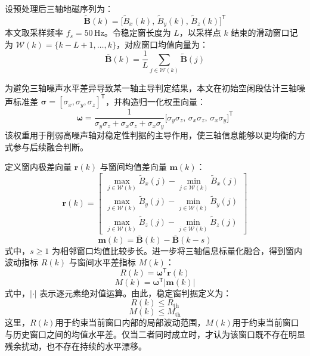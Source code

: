 \documentclass{xdupgthesis}
\begin{document}
设预处理后三轴地磁序列为：
\begin{equation}
    \widetilde{\mathbf{B}}(k)=\big[\widetilde{B}_x(k),\,\widetilde{B}_y(k),\,\widetilde{B}_z(k)\big]^{\mathsf{T}}
\end{equation}
本文取采样频率 $f_s=50\,\mathrm{Hz}$。令稳定窗长度为 $L$，以采样点 $k$ 结束的滑动窗口记为 $\mathcal{W}(k)=\{k-L+1,\ldots,k\}$，对应窗口均值向量为：
\begin{equation}
    \overline{\mathbf{B}}(k)=\frac{1}{L}\sum_{j\in\mathcal{W}(k)}\widetilde{\mathbf{B}}(j)
\end{equation}

为避免三轴噪声水平差异导致某一轴主导判定结果，本文在初始空闲段估计三轴噪声标准差 $\boldsymbol{\sigma}=[\sigma_x,\sigma_y,\sigma_z]^{\mathsf{T}}$，并构造归一化权重向量：
\begin{equation}
    \boldsymbol{\omega}=\frac{1}{\sigma_y\sigma_z+\sigma_x\sigma_z+\sigma_x\sigma_y}
    \big[\sigma_y\sigma_z,\,\sigma_x\sigma_z,\,\sigma_x\sigma_y\big]^{\mathsf{T}}
\end{equation}
该权重用于削弱高噪声轴对稳定性判据的主导作用，使三轴信息能够以更均衡的方式参与后续融合判断。

定义窗内极差向量 $\mathbf{r}(k)$ 与窗间均值差向量 $\mathbf{m}(k)$：
\begin{equation}
    \mathbf{r}(k)=\begin{bmatrix}
        \max\limits_{j\in\mathcal{W}(k)}\widetilde{B}_x(j)-\min\limits_{j\in\mathcal{W}(k)}\widetilde{B}_x(j)\\
        \max\limits_{j\in\mathcal{W}(k)}\widetilde{B}_y(j)-\min\limits_{j\in\mathcal{W}(k)}\widetilde{B}_y(j)\\
        \max\limits_{j\in\mathcal{W}(k)}\widetilde{B}_z(j)-\min\limits_{j\in\mathcal{W}(k)}\widetilde{B}_z(j)
    \end{bmatrix}
\end{equation}
\begin{equation}
    \mathbf{m}(k)=\overline{\mathbf{B}}(k)-\overline{\mathbf{B}}(k-s)
\end{equation}
式中，$s\ge 1$ 为相邻窗口均值比较步长。进一步将三轴信息标量化融合，得到窗内波动指标 $R(k)$ 与窗间水平差指标 $M(k)$：
\begin{equation}
    R(k)=\boldsymbol{\omega}^{\mathsf{T}}\mathbf{r}(k)
\end{equation}
\begin{equation}
    M(k)=\boldsymbol{\omega}^{\mathsf{T}}\left|\mathbf{m}(k)\right|
\end{equation}
式中，$|\cdot|$ 表示逐元素绝对值运算。由此，稳定窗判据定义为：
\begin{equation}
    R(k)\le R_{\mathrm{th}}
\end{equation}
\begin{equation}
    M(k)\le M_{\mathrm{th}}
\end{equation}
这里，$R(k)$用于约束当前窗口内部的局部波动范围，$M(k)$用于约束当前窗口与历史窗口之间的均值水平差。仅当二者同时成立时，才认为该窗口既不存在明显残余扰动，也不存在持续的水平漂移。
\end{document}

